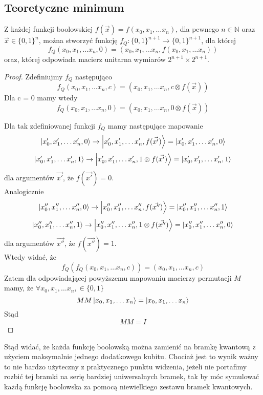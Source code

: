 \subsection{Teoretyczne minimum}
\begin{lemma}
    Z każdej funkcji boolowskiej $f(\vec{x}) = f(x_0, x_1, \ldots x_n)$, dla pewnego $n \in \mathbb{N}$ oraz $\vec{x} \in \{0, 1\}^n$, można stworzyć funkcję $f_Q : \{0, 1\}^{n+1}\rightarrow \{0, 1\}^{n+1}$, dla której 
    \[f_Q(x_0, x_1, \ldots x_n, 0) = (x_0, x_1, \ldots x_n, f(x_0, x_1, \ldots x_n))\] 
    oraz, której odpowiada macierz unitarna wymiarów $2^{n+1} \times 2^{n+1}$.
\end{lemma}
\begin{proof}
    Zdefiniujmy $f_Q$ następująco
    \[f_Q(x_0, x_1, \ldots x_n, c) = (x_0, x_1, \ldots x_n, c \otimes f(\vec{x}))\]
    Dla c = 0 mamy wtedy
    \[f_Q(x_0, x_1, \ldots x_n, 0) = (x_0, x_1, \ldots x_n, 0 \otimes f(\vec{x}))\]
    \par Dla tak zdefiniowanej funkcji $f_Q$ mamy następujące mapowanie
    \[\ket{x_0', x_1', \ldots x_n', 0} \rightarrow \ket{x_0', x_1', \ldots x_n', f(\vec{x'})} = \ket{x_0', x_1', \ldots x_n', 0}\]
    \[\ket{x_0', x_1', \ldots x_n', 1} \rightarrow \ket{x_0', x_1', \ldots x_n', 1 \otimes f(\vec{x'})} = \ket{x_0', x_1', \ldots x_n', 1}\]
    dla argumentów $\vec{x'}$, że $f(\vec{x'}) = 0$.\\
    Analogicznie
    \[\ket{x_0'', x_1'', \ldots x_n'', 0} \rightarrow \ket{x_0'', x_1'', \ldots x_n'', f(\vec{x''})} = \ket{x_0'', x_1'', \ldots x_n'', 1}\]
    \[\ket{x_0'', x_1'', \ldots x_n'', 1} \rightarrow \ket{x_0'', x_1'', \ldots x_n'', 1 \otimes f(\vec{x''})} = \ket{x_0'', x_1'', \ldots x_n'', 0}\]
    dla argumentów $\vec{x''}$, że $f(\vec{x''}) = 1$.\\
    Wtedy widać, że
    \[f_Q(f_Q(x_0, x_1, \ldots x_n, c)) = (x_0, x_1, \ldots x_n, c)\]
    Zatem dla odpowiadającej powyższemu mapowaniu macierzy permutacji $M$ mamy, że $\forall x_0, x_1, \ldots x_n, \in \{0, 1\}$
    \[MM\ket{x_0, x_1, \ldots x_n} = \ket{x_0, x_1, \ldots x_n}\]
    Stąd
    \[MM = I\]
\end{proof}
Stąd widać, że każda funkcję boolowską można zamienić na bramkę kwantową z użyciem maksymalnie jednego dodatkowego kubitu. Chociaż jest to wynik ważny to nie bardzo użyteczny z praktycznego punktu widzenia, jeżeli nie portafimy rozbić tej bramki na serię bardziej uniwersalnych bramek, tak by móc symulować każdą funkcję boolowska za pomocą niewielkiego zestawu bramek kwantowych.
